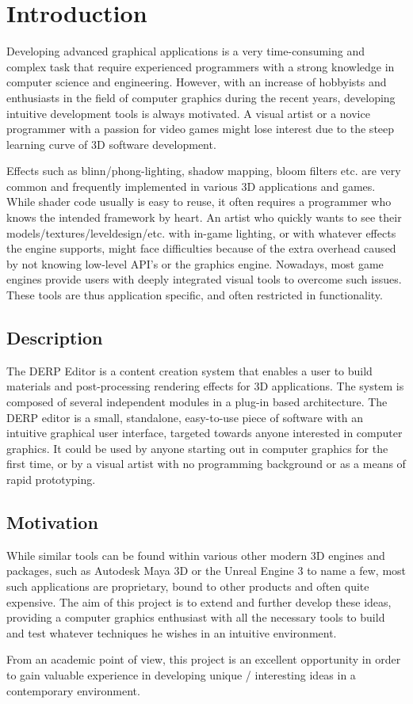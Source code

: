 \chapter{Introduction}

Developing advanced graphical applications is a very time-consuming and complex task that require experienced programmers with a strong knowledge in computer science and engineering. However, with an increase of hobbyists and enthusiasts in the field of computer graphics during the recent years, developing intuitive development tools is always motivated. A visual artist or a novice programmer with a passion for video games might lose interest due to the steep learning curve of 3D software development.

Effects such as blinn/phong-lighting, shadow mapping, bloom filters etc. are very common and frequently implemented in various 3D applications and games. While shader code usually is easy to reuse, it often requires a programmer who knows the intended framework by heart. An artist who quickly wants to see their models/textures/leveldesign/etc. with in-game lighting, or with whatever effects the engine supports, might face difficulties because of the extra overhead caused by not knowing low-level API's or the graphics engine. Nowadays, most game engines provide users with deeply integrated visual tools to overcome such issues. These tools are thus application specific, and often restricted in functionality. 
 
\section{Description}

The DERP Editor is a content creation system that enables a user to build materials and post-processing rendering effects for 3D applications. The system is composed of several independent modules in a plug-in based architecture. The DERP editor is a small, standalone, easy-to-use piece of software with an intuitive graphical user interface, targeted towards anyone interested in computer graphics. It could be used by anyone starting out in computer graphics for the first time, or by a visual artist with no programming background or as a means of rapid prototyping. 

\section{Motivation}
While similar tools can be found within various other modern 3D engines and packages, such as Autodesk Maya 3D or the Unreal Engine 3 to name a few, most such applications are proprietary, bound to other products and often quite expensive. The aim of this project is to extend and further develop these ideas, providing a computer graphics enthusiast with all the necessary tools to build and test whatever techniques he wishes in an intuitive environment. 
 
From an academic point of view, this project is an excellent opportunity in order to gain valuable experience in developing unique / interesting ideas in a contemporary environment. 
 